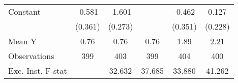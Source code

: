 {\begin{tabular}{l*{5}{c}}
\addlinespace
Constant            &      -0.581         &      -1.601\sym{***}&                     &      -0.462         &       0.127         \\
                    &     (0.361)         &     (0.273)         &                     &     (0.351)         &     (0.228)         \\
\midrule
Mean Y              &        0.76         &        0.76         &        0.76         &        1.89         &        2.21         \\
Observations        &         399         &         403         &         399         &         404         &         400         \\
Exc. Inst. F-stat   &                     &      32.632         &      37.685         &      33.880         &      41.262         \\
\bottomrule
\end{tabular}
}
